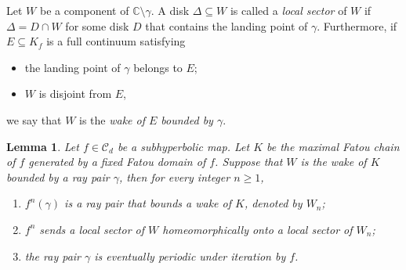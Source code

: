 \documentclass[a4paper,reqno,times, 11pt]{amsart}
\newtheorem{lemma}[theorem]{Lemma}
\theoremstyle{remark}
\theoremstyle{plain}
\numberwithin{equation}{section}
\def\CCCC{\mathscr C}
\def\g{\gamma}
\def\De{\Delta}
\def\C{\mbox{$\mathbb C$}}
\begin{document}
Let $W$ be a component of $\C\setminus \g$. A disk $\De\subseteq W$ is called   a \emph{local sector} of  $W$ if $\De=D\cap W$ for some  disk $D$ that contains the landing point of $\g$. Furthermore, if
$E\subseteq K_f$ is a full continuum satisfying
\begin{itemize}
	\item the landing point of $\g$ belongs to $E$;
	\item $W$ is disjoint from $E$,
\end{itemize}
we say that $W$ is the \emph{wake of $E$ bounded by $\g$}.



\begin{lemma}\label{pro:wake}
	Let $f\in\CCCC_d$ be a subhyperbolic map. Let $K$ be the maximal Fatou chain of $f$ generated by a fixed Fatou domain of $f$. Suppose that $W$ is the wake of $K$ bounded by a ray pair $\g$, then for every integer $n\geq 1$,
	\begin{enumerate}
		\item $f^n(\g)$ is  a ray pair that bounds a wake of $K$, denoted by $W_n$;
		\item $f^n$ sends a local sector of $W$ homeomorphically onto a local sector of $W_n$;
		\item the ray pair $\g$ is eventually periodic under iteration by $f$.
	\end{enumerate}
\end{lemma}
\end{document}
